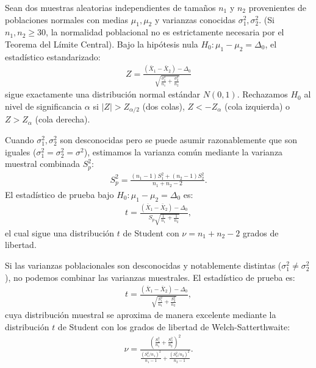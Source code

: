 \begin{teorema}
	Sean dos muestras aleatorias independientes de tamaños $n_1$ y $n_2$ provenientes de poblaciones normales con medias $\mu_1, \mu_2$ y varianzas conocidas $\sigma_1^2, \sigma_2^2$. (Si $n_1, n_2 \geq 30$, la normalidad poblacional no es estrictamente necesaria por el Teorema del Límite Central). Bajo la hipótesis nula $H_0: \mu_1 - \mu_2 = \Delta_0$, el estadístico estandarizado:
	\begin{align}
		Z = \frac{(\bar{X}_1 - \bar{X}_2) - \Delta_0}{\sqrt{\frac{\sigma_1^2}{n_1} + \frac{\sigma_2^2}{n_2}}}
	\end{align}
	sigue exactamente una distribución normal estándar $N(0,1)$. Rechazamos $H_0$ al nivel de significancia $\alpha$ si $|Z| > Z_{\alpha/2}$ (dos colas), $Z < -Z_\alpha$ (cola izquierda) o $Z > Z_\alpha$ (cola derecha).
\end{teorema}

\begin{teorema}
	Cuando $\sigma_1^2, \sigma_2^2$ son desconocidas pero se puede asumir razonablemente que son iguales ($\sigma_1^2 = \sigma_2^2 = \sigma^2$), estimamos la varianza común mediante la varianza muestral combinada $S_p^2$:
	\begin{align}
		S_p^2 = \frac{(n_1 - 1)S_1^2 + (n_2 - 1)S_2^2}{n_1 + n_2 - 2}.
	\end{align}
	El estadístico de prueba bajo $H_0: \mu_1 - \mu_2 = \Delta_0$ es:
	\begin{align}
		t = \frac{(\bar{X}_1 - \bar{X}_2) - \Delta_0}{S_p \sqrt{\frac{1}{n_1} + \frac{1}{n_2}}},
	\end{align}
	el cual sigue una distribución $t$ de Student con $\nu = n_1 + n_2 - 2$ grados de libertad.
\end{teorema}

\begin{teorema}
	Si las varianzas poblacionales son desconocidas y notablemente distintas ($\sigma_1^2 \neq \sigma_2^2$), no podemos combinar las varianzas muestrales. El estadístico de prueba es:
	\begin{align}
		t = \frac{(\bar{X}_1 - \bar{X}_2) - \Delta_0}{\sqrt{\frac{S_1^2}{n_1} + \frac{S_2^2}{n_2}}},
	\end{align}
	cuya distribución muestral se aproxima de manera excelente mediante la distribución $t$ de Student con los grados de libertad de Welch-Satterthwaite:
	\begin{align}
		\nu = \frac{\left( \frac{S_1^2}{n_1} + \frac{S_2^2}{n_2} \right)^2}{\frac{\left(S_1^2/n_1\right)^2}{n_1 - 1} + \frac{\left(S_2^2/n_2\right)^2}{n_2 - 1}}.
	\end{align}
\end{teorema}

